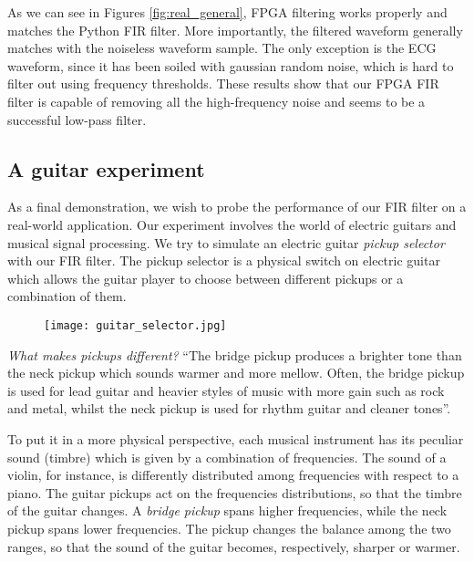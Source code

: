 %





As we can see in Figures \ref{fig:real_general}, FPGA filtering works properly and matches the Python FIR filter. More importantly, the filtered waveform generally matches with the noiseless waveform sample. The only exception is the ECG waveform, since it has been soiled with gaussian random noise, which is hard to filter out using frequency thresholds. These results show that our FPGA FIR filter is capable of removing all the high-frequency noise and seems to be a successful low-pass filter.


\subsection{A guitar experiment}
\label{ssec:demo_guitar}

As a final demonstration, we wish to probe the performance of our FIR filter on a real-world application. Our experiment involves the world of electric guitars and musical signal processing. We try to simulate an electric guitar \emph{pickup selector} with our FIR filter. The pickup selector is a physical switch on electric guitar which allows the guitar player to choose between different pickups or a combination of them.

\begin{figure}[H]
    \centering
    \texttt{[image: guitar\_selector.jpg]}
\end{figure}

\emph{What makes pickups different?} “The bridge pickup produces a brighter tone than the neck pickup which sounds warmer and more mellow. Often, the bridge pickup is used for lead guitar and heavier styles of music with more gain such as rock and metal, whilst the neck pickup is used for rhythm guitar and cleaner tones”\cite{pickup_guitar}.

To put it in a more physical perspective, each musical instrument has its peculiar sound (timbre) which is given by a combination of frequencies. The sound of a violin, for instance, is differently distributed among frequencies with respect to a piano. The guitar pickups act on the frequencies distributions, so that the timbre of the guitar changes. 
A \emph{bridge pickup} spans higher frequencies, while the neck pickup spans lower frequencies. The pickup changes the balance among the two ranges, so that the sound of the guitar becomes, respectively, sharper or warmer.

